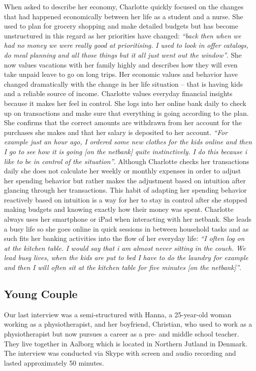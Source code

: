 When asked to describe her economy, Charlotte quickly focused on the changes that had happened economically between her life as a student and a nurse. She used to plan for grocery shopping and make detailed budgets but has become unstructured in this regard as her priorities have changed: \emph{“back then when we had no money we were really good at prioritising. I used to look in offer catalogs, do meal planning and all those things but it all just went out the window”}. She now values vacations with her family highly and describes how they will even take unpaid leave to go on long trips. Her economic values and behavior have changed dramatically with the change in her life situation -- that is having kids and a reliable source of income.
Charlotte values everyday financial insights because it makes her feel in control. She logs into her online bank daily to check up on transactions and make sure that everything is going according to the plan. She confirms that the correct amounts are withdrawn from her account for the purchases she makes and that her salary is deposited to her account. \emph{“For example just an hour ago, I ordered some new clothes for the kids online and then I go to see how it is going [on the netbank] quite instinctively. I do this because i like to be in control of the situation”}. Although Charlotte checks her transactions daily she does not calculate her weekly or monthly expenses in order to adjust her spending behavior but rather makes the adjustment based on intuition after glancing through her transactions. This habit of adapting her spending behavior reactively based on intuition is a way for her to stay in control after she stopped making budgets and knowing exactly how their money was spent.
Charlotte always uses her smartphone or iPad when interacting with her netbank. She leads a busy life so she goes online in quick sessions in between household tasks and as such fits her banking activities into the flow of her everyday life: \emph{“I often log on at the kitchen table. I would say that i am almost never sitting in the couch. We lead busy lives, when the kids are put to bed I have to do the laundry for example and then I will often sit at the kitchen table for five minutes [on the netbank]”}.

\subsection{Young Couple}
Our last interview was a semi-structured with Hanna, a 25-year-old woman working as a physiotherapist, and her boyfriend, Christian, who used to work as a physiotherapist but now pursues a career as a pre- and middle school teacher. They live together in Aalborg which is located in Northern Jutland in Denmark. The interview was conducted via Skype with screen and audio recording and lasted approximately 50 minutes.\\

